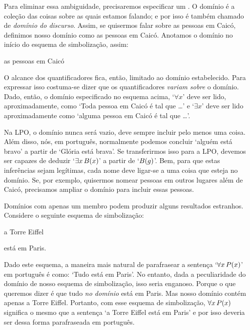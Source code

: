 Para eliminar essa ambiguidade, precisaremos especificar um .
O domínio é a coleção das coisas sobre as quais estamos falando; e por isso é também chamado de \emph{domínio do discurso}.
Assim, se quisermos falar sobre as pessoas em Caicó, definimos nosso domínio como as pessoas em Caicó.
Anotamos o domínio no início do esquema de simbolização, assim:
\begin{center}
	\begin{ekey}
		\item[\text{domínio}] as pessoas em Caicó
	\end{ekey}
\end{center}
O alcance dos quantificadores fica, então, limitado ao domínio estabelecido.
Para expressar isso costuma-se dizer que os quantificadores \emph{variam sobre} o domínio.
Dado, então, o domínio especificado no esquema acima, `$\forall x$' deve ser lido, aproximadamente, como  `Toda pessoa em Caicó é tal que \ldots' e `$\exists x $' deve ser lido aproximadamente como `alguma pessoa em Caicó é tal que \ldots'. 


Na LPO, o domínio nunca será vazio, deve sempre incluir pelo menos uma coisa. Além disso, nós, em português, normalmente podemos concluir `alguém está bravo' a partir de `Glória está brava'.
Se transferirmos isso para a LPO, devemos ser capazes de deduzir `$\exists x\, \mathord{B}(x)$' a partir de `$\mathord{B}(g)$'.
Bem, para que estas inferências sejam legítimas, cada nome deve ligar-se a uma coisa que esteja no domínio.
Se, por exemplo, quisermos nomear pessoas em outros lugares além de Caicó, precisamos ampliar o domínio para incluir essas pessoas. 

Domínios com apenas um membro podem produzir alguns resultados estranhos.
Considere o seguinte esquema de simbolização:
\begin{center}
\begin{ekey}
\item[\text{domínio}] a Torre Eiffel
\item[\atom{P}{x}]  está em Paris.
\end{ekey}
\end{center}
Dado este esquema, a maneira mais natural de parafrasear a sentença `$\forall x\,\mathord{P}(x)$' em português é como: `Tudo está em Paris'.
No entanto, dada a peculiaridade do domínio de nosso esquema de simbolização, isso seria enganoso.
Porque o que queremos dizer é que tudo \emph{no domínio} está em Paris.
Mas nosso domínio contém apenas a Torre Eiffel.
Portanto, com esse esquema de simbolização, $\forall x\,\mathord{P}(x)$ significa o mesmo que a sentença `a Torre Eiffel está em Paris' e por isso deveria ser dessa forma parafraseada em português.


